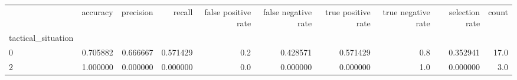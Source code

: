 \begin{tabular}{lrrrrrrrrr}
\toprule
{} &  accuracy &  precision &    recall &  false positive rate &  false negative rate &  true positive rate &  true negative rate &  selection rate &  count \\
tactical\_situation &           &            &           &                      &                      &                     &                     &                 &        \\
\midrule
0                  &  0.705882 &   0.666667 &  0.571429 &                  0.2 &             0.428571 &            0.571429 &                 0.8 &        0.352941 &   17.0 \\
2                  &  1.000000 &   0.000000 &  0.000000 &                  0.0 &             0.000000 &            0.000000 &                 1.0 &        0.000000 &    3.0 \\
\bottomrule
\end{tabular}
